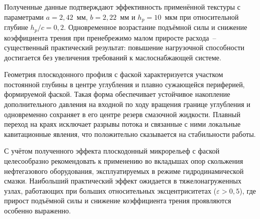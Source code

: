 Полученные данные подтверждают эффективность применённой текстуры с параметрами $a = 2{,}42$~мм, $b = 2{,}22$~мм и $h_p = 10$~мкм при относительной глубине $h_p/c = 0{,}2$. Одновременное возрастание подъёмной силы и снижение коэффициента трения при пренебрежимо малом приросте расхода~-- существенный практический результат: повышение нагрузочной способности достигается без увеличения требований к маслоснабжающей системе.

Геометрия плоскодонного профиля с фаской характеризуется участком постоянной глубины в центре углубления и плавно сужающейся периферией, формируемой фаской. Такая форма обеспечивает устойчивое накопление дополнительного давления на входной по ходу вращения границе углубления и одновременно сохраняет в его центре резерв смазочной жидкости. Плавный переход на краях исключает разрывы потока и связанные с ними локальные кавитационные явления, что положительно сказывается на стабильности работы.

С учётом полученного эффекта плоскодонный микрорельеф с фаской целесообразно рекомендовать к применению во вкладышах опор скольжения нефтегазового оборудования, эксплуатируемых в режиме гидродинамической смазки. Наибольший практический эффект ожидается в тяжелонагруженных узлах, работающих при больших относительных эксцентриситетах ($\varepsilon > 0{,}5$), где прирост подъёмной силы и снижение коэффициента трения проявляются особенно выраженно.
